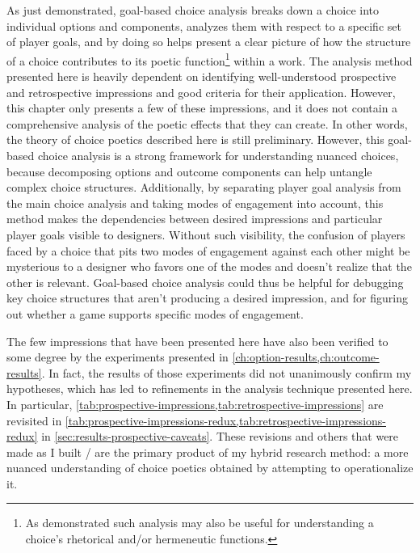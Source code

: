As just demonstrated, goal-based choice analysis breaks down a choice into individual options and components, analyzes them with respect to a specific set of player goals, and by doing so helps present a clear picture of how the structure of a choice contributes to its poetic function\footnote{As demonstrated such analysis may also be useful for understanding a choice's rhetorical and/or hermeneutic functions.} within a work.
%
The analysis method presented here is heavily dependent on identifying well-understood prospective and retrospective impressions and good criteria for their application.
%
However, this chapter only presents a few of these impressions, and it does not contain a comprehensive analysis of the poetic effects that they can create.
%
In other words, the theory of choice poetics described here is still preliminary.
%
However, this goal-based choice analysis is a strong framework for understanding nuanced choices, because decomposing options and outcome components can help untangle complex choice structures.
%
Additionally, by separating player goal analysis from the main choice analysis and taking modes of engagement into account, this method makes the dependencies between desired impressions and particular player goals visible to designers.
%
Without such visibility, the confusion of players faced by a choice that pits two modes of engagement against each other might be mysterious to a designer who favors one of the modes and doesn't realize that the other is relevant.
%
Goal-based choice analysis could thus be helpful for debugging key choice structures that aren't producing a desired impression, and for figuring out whether a game supports specific modes of engagement.


The few impressions that have been presented here have also been verified to some degree by the experiments presented in \cref{ch:option-results,ch:outcome-results}.
%
In fact, the results of those experiments did not unanimously confirm my hypotheses, which has led to refinements in the analysis technique presented here.
%
In particular, \cref{tab:prospective-impressions,tab:retrospective-impressions} are revisited in \cref{tab:prospective-impressions-redux,tab:retrospective-impressions-redux} in \cref{sec:results-prospective-caveats}.
%
These revisions and others that were made as I built \dunyazad/ are the primary product of my hybrid research method: a more nuanced understanding of choice poetics obtained by attempting to operationalize it.


